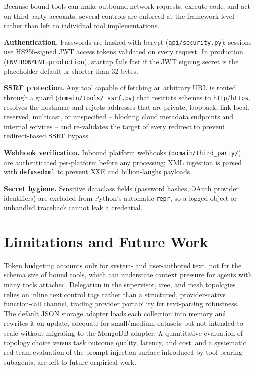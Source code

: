 \documentclass[conference]{IEEEtran}
\begin{document}
Because bound tools can make outbound network requests, execute code, and
act on third-party accounts, several controls are enforced at the
framework level rather than left to individual tool implementations.

\textbf{Authentication.} Passwords are hashed with bcrypt
(\texttt{api/security.py}); sessions use HS256-signed JWT access tokens
validated on every request. In production
(\texttt{ENVIRONMENT=production}), startup fails fast if the JWT signing
secret is the placeholder default or shorter than 32 bytes.

\textbf{SSRF protection.} Any tool capable of fetching an arbitrary URL is
routed through a guard (\texttt{domain/tools/\_ssrf.py}) that restricts
schemes to \texttt{http}/\texttt{https}, resolves the hostname and rejects
addresses that are private, loopback, link-local, reserved, multicast, or
unspecified -- blocking cloud metadata endpoints and internal services --
and re-validates the target of every redirect to prevent
redirect-based SSRF bypass.

\textbf{Webhook verification.} Inbound platform webhooks
(\texttt{domain/third\_party/}) are authenticated per-platform before any
processing; XML ingestion is parsed with \texttt{defusedxml} to prevent
XXE and billion-laughs payloads.

\textbf{Secret hygiene.} Sensitive dataclass fields (password hashes,
OAuth provider identifiers) are excluded from Python's automatic
\texttt{repr}, so a logged object or unhandled traceback cannot leak a
credential.

\section{Limitations and Future Work}
\label{sec:limitations}

Token budgeting accounts only for system- and user-authored text, not for
the schema size of bound tools, which can understate context pressure for
agents with many tools attached. Delegation in the supervisor, tree, and
mesh topologies relies on inline text control tags rather than a
structured, provider-native function-call channel, trading provider
portability for text-parsing robustness. The default JSON storage adapter
loads each collection into memory and rewrites it on update, adequate for
small/medium datasets but not intended to scale without migrating to the
MongoDB adapter. A quantitative evaluation of topology choice versus task
outcome quality, latency, and cost, and a systematic red-team evaluation
of the prompt-injection surface introduced by tool-bearing subagents, are
left to future empirical work.
\end{document}
